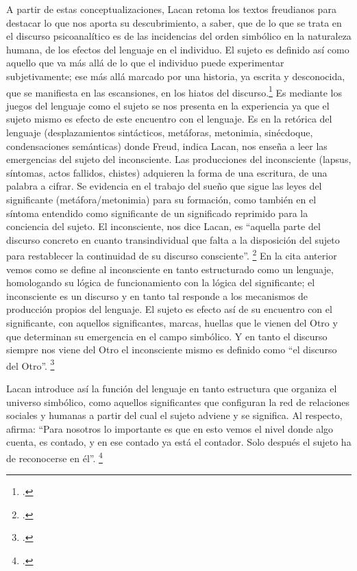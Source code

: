 A partir de estas conceptualizaciones, Lacan retoma los textos freudianos para destacar lo que nos aporta su descubrimiento, a saber, que de lo que se trata en el discurso psicoanalítico es de las incidencias del orden simbólico en la naturaleza humana, de los efectos del lenguaje en el individuo. El sujeto es definido así como aquello que va más allá de lo que el individuo puede experimentar subjetivamente; ese más allá marcado por una historia, ya escrita y desconocida, que se manifiesta en las escansiones, en los hiatos del discurso.\footcite[]{@7105-LACAN2000} Es mediante los juegos del lenguaje como el sujeto se nos presenta en la experiencia ya que el sujeto mismo es efecto de este encuentro con el lenguaje. Es en la retórica del lenguaje (desplazamientos sintácticos, metáforas, metonimia, sinécdoque, condensaciones semánticas) donde Freud, indica Lacan, nos enseña a leer las emergencias del sujeto del inconsciente. Las producciones del inconsciente (lapsus, síntomas, actos fallidos, chistes) adquieren la forma de una escritura, de una palabra a cifrar. Se evidencia en el trabajo del sueño que sigue las leyes del significante (metáfora/metonimia) para su formación, como también en el síntoma entendido como significante de un significado reprimido para la conciencia del sujeto. El inconsciente, nos dice Lacan, es \enquote{aquella parte del discurso concreto en cuanto transindividual que falta a la disposición del sujeto para restablecer la continuidad de su discurso consciente}. \footcite[][248]{@7105-LACAN2000} En la cita anterior vemos como se define al inconsciente en tanto estructurado como un lenguaje, homologando su lógica de funcionamiento con la lógica del significante; el inconsciente es un discurso y en tanto tal responde a los mecanismos de producción propios del lenguaje. El sujeto es efecto así de su encuentro con el significante, con aquellos significantes, marcas, huellas que le vienen del Otro y que determinan su emergencia en el campo simbólico. Y en tanto el discurso siempre nos viene del Otro el inconsciente mismo es definido como \enquote{el discurso del Otro}. \footcite[][254]{@7105-LACAN2000}

Lacan introduce así la función del lenguaje en tanto estructura que organiza el universo simbólico, como aquellos significantes que configuran la red de relaciones sociales y humanas a partir del cual el sujeto adviene y se significa. Al respecto, afirma: \enquote{Para nosotros lo importante es que en esto vemos el nivel donde  algo cuenta, es contado, y en ese contado ya está el contador. Solo después el sujeto ha de reconocerse en él}. \footcite[][28]{@7106-LACAN2006}

